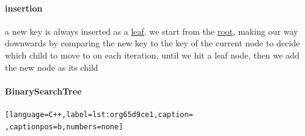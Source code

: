 \documentclass[a4paper,12pt]{article}
\begin{document}
\paragraph{insertion}
\label{sec:org8a19b6e}
a new key is always inserted as a \hyperref[sec:orge114c93]{leaf}. we start from the \hyperref[sec:org76387eb]{root}, making our way downwards by comparing the new key to the key of the current node to decide which child to move to on each iteration, until we hit a leaf node, then we add the new node as its child\\[0pt]
\paragraph{BinarySearchTree}
\label{sec:org2906779}
\begin{lstlisting}[language=C++,label=lst:org65d9ce1,caption= ,captionpos=b,numbers=none]



\end{lstlisting}
\end{document}
